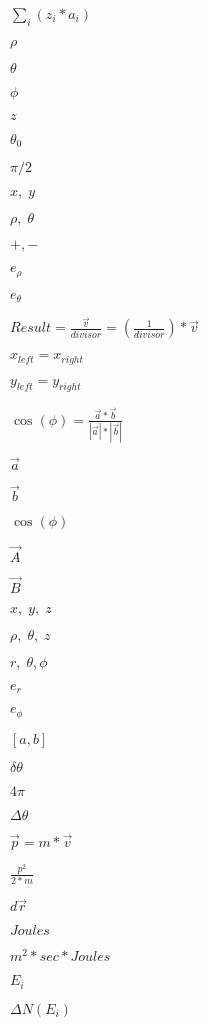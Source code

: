 \documentclass{article}
\begin{document}
$ \sum_{i} (z_{i}*a_{i}) $
\pagebreak

$ \rho $
\pagebreak

$ \theta $
\pagebreak

$ \phi $
\pagebreak

$ z $
\pagebreak

$ \theta_{0} $
\pagebreak

$ \pi/2 $
\pagebreak

$x,\; y$
\pagebreak

$ \rho,\; \theta$
\pagebreak

$ +, - $
\pagebreak

$ e_{\rho} $
\pagebreak

$ e_{\theta} $
\pagebreak

$ Result = \frac{\vec{v}}{divisor} = \left(\frac{1}{divisor}\right) * \vec{v} $
\pagebreak

$ x_{left} = x_{right} $
\pagebreak

$ y_{left} = y_{right} $
\pagebreak

$ \cos( \phi ) = \frac{ \vec{a} * \vec{b} }{ | \vec{a} | * | \vec{b} | } $
\pagebreak

$ \vec{a} $
\pagebreak

$ \vec{b} $
\pagebreak

$ \cos( \phi )$
\pagebreak

$ \vec{A} $
\pagebreak

$ \vec{B} $
\pagebreak

$x,\; y, \; z$
\pagebreak

$ \rho,\; \theta, \; z$
\pagebreak

$ r,\; \theta, \phi $
\pagebreak

$ e_{r} $
\pagebreak

$ e_{\phi} $
\pagebreak

$ [a,b] $
\pagebreak

$ \delta \theta $
\pagebreak

$ 4 \pi $
\pagebreak

$ \Delta \theta $
\pagebreak

$ \vec{p} = m*\vec{v} $
\pagebreak

$ \frac{p^{2}}{2*m} $
\pagebreak

$ d\vec{r} $
\pagebreak

$ Joules $
\pagebreak

$ m^{2}*sec*Joules $
\pagebreak

$ E_{i} $
\pagebreak

$ \Delta N(E_{i}) $
\pagebreak
\end{document}
